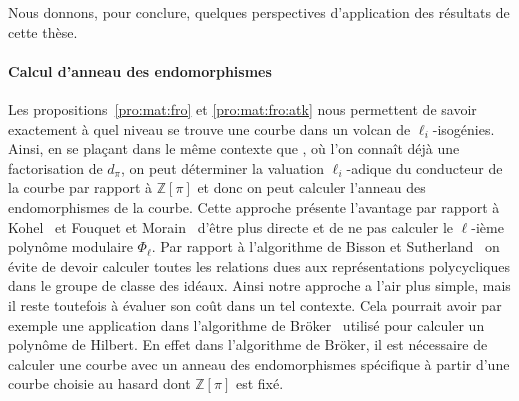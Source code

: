 \documentclass[10pt,a4paper]{book}
\theoremstyle{plain}
\theoremstyle{definition}
\theoremstyle{definition}
\theoremstyle{definition}
\theoremstyle{definition}
\theoremstyle{definition}
\theoremstyle{remark}
\theoremstyle{remark}
\theoremstyle{definition}
\begin{document}
Nous donnons, pour conclure, quelques perspectives d'application des
résultats de cette thèse.

\paragraph{Calcul d'anneau des endomorphismes}
Les propositions~\ref{pro:mat:fro} et \ref{pro:mat:fro:atk} nous 
permettent de savoir exactement à quel niveau se trouve une courbe dans un 
volcan de $\ell_i$-isogénies. Ainsi, en se plaçant dans le même contexte que 
\cite{Kohel96,BissonSutherland11}, où l'on connaît déjà une factorisation de 
$d_{\pi}$, on peut déterminer la valuation $\ell_i$-adique du conducteur de la 
courbe par rapport à $\mathbb{Z}[\pi]$ et donc on peut calculer l'anneau des 
endomorphismes de la courbe.  %
Cette approche présente l'avantage par rapport à Kohel~\cite{Kohel96} et 
Fouquet et Morain~\cite{FouquetMorain02} d'être plus directe et de ne pas 
calculer le $\ell$-ième polynôme modulaire $\Phi_{\ell}$. Par rapport à 
l'algorithme de Bisson et Sutherland~\cite{BissonSutherland11} on évite de 
devoir calculer toutes les relations dues aux représentations polycycliques 
dans le groupe de classe des idéaux. Ainsi notre approche a l'air plus simple, 
mais il reste toutefois à évaluer son coût dans un tel contexte.
Cela pourrait avoir par exemple une application dans l'algorithme de
Bröker~\cite{Broker08} utilisé pour calculer un polynôme de Hilbert. En effet 
dans l'algorithme de Bröker, il est nécessaire de calculer une courbe avec un 
anneau des endomorphismes spécifique à partir d'une courbe choisie au hasard dont 
$\mathbb{Z}[\pi]$ est fixé.
\end{document}

